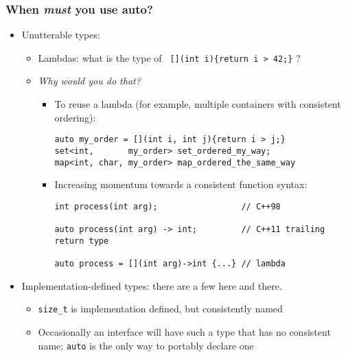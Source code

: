 \begin{frame}[fragile]
\end{frame}

\begin{frame}[fragile]
\frametitle{When \emph{must} you use auto?}

\begin{itemize} %
\item Unutterable types:
  \begin{itemize} %
    \item Lambdas: what is the type of {\scriptsize\texttt{  [](int i)\{return i > 42;\}}} ?
    \item \emph{Why would you do that?}
\begin{itemize}
\item To reuse a lambda (for example, multiple containers with
  consistent ordering):
{\scriptsize
\begin{verbatim}
auto my_order = [](int i, int j){return i > j;}
set<int,       my_order> set_ordered_my_way;
map<int, char, my_order> map_ordered_the_same_way
\end{verbatim}}
\item Increasing momentum towards a consistent function syntax:
{\scriptsize \begin{verbatim}
int process(int arg);                 // C++98

auto process(int arg) -> int;         // C++11 trailing return type

auto process = [](int arg)->int {...} // lambda
\end{verbatim}}

\end{itemize}
  \end{itemize} %
\vskip 12pt
\item Implementation-defined types: there are a few here and there.
\begin{itemize}
  \item \texttt{size\_t} is implementation defined, but consistently
    named
  \item Occasionally an interface will have such a type that has no
    consistent name; \texttt{auto} is the only way to portably declare one
\end{itemize}
\end{itemize} %

\end{frame}


